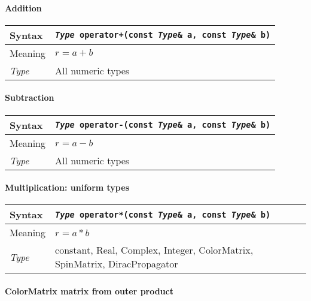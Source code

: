 \documentclass[12pt,letterpaper]{article}
\newcommand{\tConstant}{constant}
\newcommand{\tReal}{Real}
\newcommand{\tComplex}{Complex}
\newcommand{\tInt}{Integer}
\newcommand{\tColorMatrix}{ColorMatrix}
\newcommand{\tDiracPropagator}{DiracPropagator}
\newcommand{\tSpinMatrix}{SpinMatrix}
\newcommand{\allNumericTypes}{All numeric types}
\newcommand{\itt}{\it Type}
\newcommand{\protoBBinaryQual}[1]{{\tt {\it Type} #1(const {\it Type}\& a, const {\it Type}\& b)}}
\begin{document}
\paragraph{Addition}

\begin{flushleft}
  \begin{tabular}{|l|l|}
  \hline
  Syntax      & \protoBBinaryQual{operator+} \\
  \hline
  Meaning     & $r = a + b$ \\
  \hline
  \itt        & \allNumericTypes \\
  \hline
  \end{tabular}
\end{flushleft}

\paragraph{Subtraction}

\begin{flushleft}
  \begin{tabular}{|l|l|}
  \hline
  Syntax      & \protoBBinaryQual{operator-} \\
  \hline
  Meaning     & $r = a - b$ \\
  \hline
  \itt        & \allNumericTypes \\
  \hline
  \end{tabular}
\end{flushleft}

\paragraph{Multiplication: uniform types}

\begin{flushleft}
  \begin{tabular}{|l|l|}
  \hline
  Syntax      & \protoBBinaryQual{operator*} \\
  \hline
  Meaning     & $r = a * b$ \\
  \hline
  \itt        & \tConstant, \tReal, \tComplex, \tInt, \tColorMatrix, \tSpinMatrix, \tDiracPropagator\\
  \hline
  \end{tabular}
\end{flushleft}

\paragraph{ColorMatrix matrix from outer product}
\end{document}
